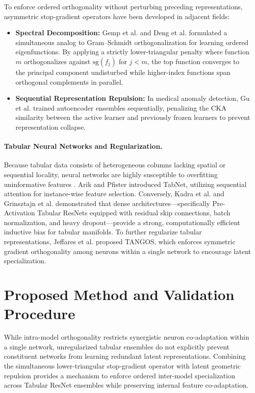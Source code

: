 \documentclass[11pt, a4paper]{article}
\begin{document}
To enforce ordered orthogonality without perturbing preceding representations, asymmetric stop-gradient operators have been developed in adjacent fields:
\begin{itemize}
    \item \textbf{Spectral Decomposition:} Gemp et al. \cite{gemp2021eigengame} and Deng et al. \cite{deng2022neuralef} formulated a simultaneous analog to Gram--Schmidt orthogonalization for learning ordered eigenfunctions. By applying a strictly lower-triangular penalty where function $m$ orthogonalizes against $\text{sg}(f_j)$ for $j < m$, the top function converges to the principal component undisturbed while higher-index functions span orthogonal complements in parallel.
    \item \textbf{Sequential Representation Repulsion:} In medical anomaly detection, Gu et al. \cite{gu2024revisiting} trained autoencoder ensembles sequentially, penalizing the CKA similarity between the active learner and previously frozen learners to prevent representation collapse.
\end{itemize}

\paragraph{Tabular Neural Networks and Regularization.}
Because tabular data consists of heterogeneous columns lacking spatial or sequential locality, neural networks are highly susceptible to overfitting uninformative features \cite{grinsztajn2022why}. Arik and Pfister \cite{arik2021tabnet} introduced TabNet, utilizing sequential attention for instance-wise feature selection. Conversely, Kadra et al. \cite{kadra2021well} and Grinsztajn et al. \cite{grinsztajn2022why} demonstrated that dense architectures—specifically Pre-Activation Tabular ResNets equipped with residual skip connections, batch normalization, and heavy dropout—provide a strong, computationally efficient inductive bias for tabular manifolds. To further regularize tabular representations, Jeffares et al. \cite{jeffares2023tangos} proposed TANGOS, which enforces symmetric gradient orthogonality among neurons within a single network to encourage latent specialization.


\section{Proposed Method and Validation Procedure}

While intra-model orthogonality \cite{jeffares2023tangos} restricts synergistic neuron co-adaptation within a single network, unregularized tabular ensembles \cite{fort2019deep, wen2020batchensemble, grinsztajn2022why} do not explicitly prevent constituent networks from learning redundant latent representations. Combining the simultaneous lower-triangular stop-gradient operator \cite{gemp2021eigengame, deng2022neuralef} with latent geometric repulsion \cite{kornblith2019similarity, gu2024revisiting} provides a mechanism to enforce ordered inter-model specialization across Tabular ResNet ensembles while preserving internal feature co-adaptation.
\end{document}
